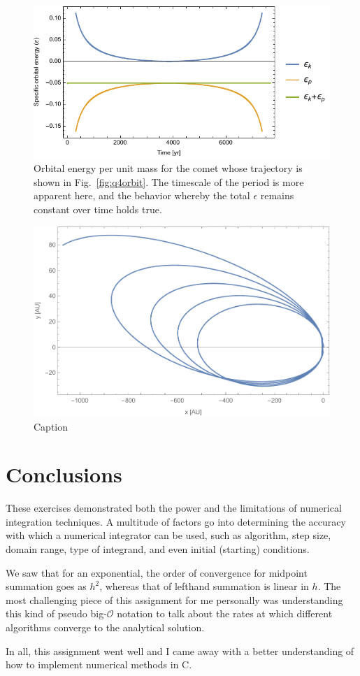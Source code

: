 \documentclass{article}
\begin{document}
\begin{figure}[h!]
    \centering
    \includegraphics[width=5in]{homework3/q4energy.pdf}
    \caption{Orbital energy per unit mass for the comet whose trajectory is shown in Fig.~\ref{fig:q4orbit}. The timescale of the period is more apparent here, and the behavior whereby the total $\epsilon$ remains constant over time holds true.}
    \label{fig:q4energy}
\end{figure}

\bigskip
{}
\medskip

\begin{figure}[h!]
    \centering
    \includegraphics[width=5in]{homework3/q5orbit.pdf}
    \caption{Caption}
    \label{fig:q5orbit}
\end{figure}

\section{Conclusions}

These exercises demonstrated both the power and the limitations of numerical integration techniques. A multitude of factors go into determining the accuracy with which a numerical integrator can be used, such as algorithm, step size, domain range, type of integrand, and even initial (starting) conditions.

We saw that for an exponential, the order of convergence for midpoint summation goes as $h^2$, whereas that of lefthand summation is linear in $h$. The most challenging piece of this assignment for me personally was understanding this kind of pseudo big-$\mathcal{O}$ notation to talk about the rates at which different algorithms converge to the analytical solution.

In all, this assignment went well and I came away with a better understanding of how to implement numerical methods in C.
\end{document}
